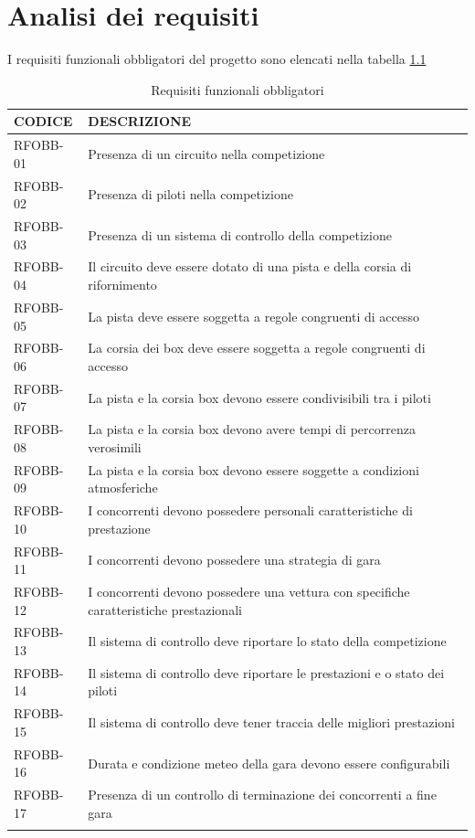 \documentclass[a4paper,11pt, twoside, openright]{book}
\begin{document}
  \chapter{Analisi dei requisiti}
    I requisiti funzionali obbligatori del progetto sono elencati nella tabella \ref{tbl:RequisitiFunzionaliObbligatori}
    
    \begin{longtable}{|p{2cm}|p{8cm}|}
      \toprule
	\bfseries{CODICE} & \bfseries{DESCRIZIONE} \\\hline
      \endfirsthead
      RFOBB-01 & Presenza di un circuito nella competizione \\\hline
      RFOBB-02 & Presenza di piloti nella competizione \\\hline 
      RFOBB-03 & Presenza di un sistema di controllo della competizione \\\hline
      RFOBB-04 & Il circuito deve essere dotato di una pista e della corsia di rifornimento \\\hline
      RFOBB-05 & La pista deve essere soggetta a regole congruenti di accesso \\\hline
      RFOBB-06 & La corsia dei box deve essere soggetta a regole congruenti di accesso \\\hline
      RFOBB-07 & La pista e la corsia box devono essere condivisibili tra i piloti \\\hline
      RFOBB-08 & La pista e la corsia box devono avere tempi di percorrenza verosimili \\\hline
      RFOBB-09 & La pista e la corsia box devono essere soggette a condizioni atmosferiche \\\hline
      RFOBB-10 & I concorrenti devono possedere personali caratteristiche di prestazione  \\\hline
      RFOBB-11 & I concorrenti devono possedere una strategia di gara  \\\hline
      RFOBB-12 & I concorrenti devono possedere una vettura con specifiche caratteristiche prestazionali  \\\hline
      RFOBB-13 & Il sistema di controllo deve riportare lo stato della competizione  \\\hline
      RFOBB-14 & Il sistema di controllo deve riportare le prestazioni e o stato dei piloti  \\\hline
      RFOBB-15 & Il sistema di controllo deve tener traccia delle migliori prestazioni  \\\hline
      RFOBB-16 & Durata e condizione meteo della gara devono essere configurabili  \\\hline
      RFOBB-17 & Presenza di un controllo di terminazione dei concorrenti a fine gara  \\\hline
      \caption{Requisiti funzionali obbligatori}
      \label{tbl:RequisitiFunzionaliObbligatori}
    \end{longtable}
\end{document}
